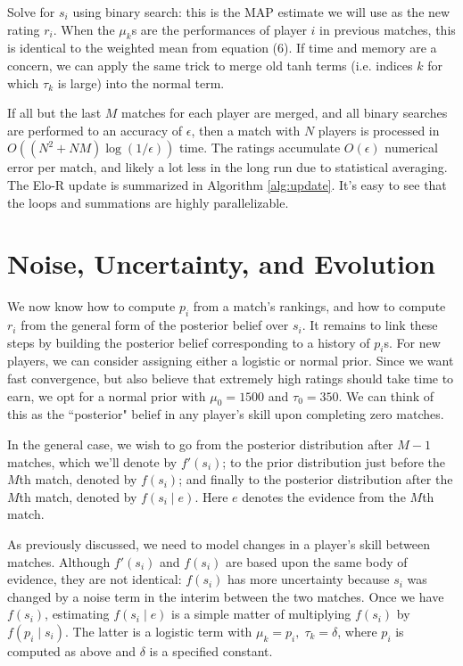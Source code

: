 \documentclass{article}
\begin{document}
Solve for $s_i$ using binary search: this is the MAP estimate we will use as the new rating $r_i$. When the $\mu_k$s are the performances of player $i$ in previous matches, this is identical to the weighted mean from equation (6). If time and memory are a concern, we can apply the same trick to merge old tanh terms (i.e. indices $k$ for which $\tau_k$ is large) into the normal term.

If all but the last $M$ matches for each player are merged, and all binary searches are performed to an accuracy of $\epsilon$, then a match with $N$ players is processed in $O((N^2+NM)\log(1/\epsilon))$ time. The ratings accumulate $O(\epsilon)$ numerical error per match, and likely a lot less in the long run due to statistical averaging. The Elo-R update is summarized in Algorithm \ref{alg:update}. It's easy to see that the loops and summations are highly parallelizable.

\section{Noise, Uncertainty, and Evolution}

We now know how to compute $p_i$ from a match's rankings, and how to compute $r_i$ from the general form of the posterior belief over $s_i$. It remains to link these steps by building the posterior belief corresponding to a history of $p_i$s. For new players, we can consider assigning either a logistic or normal prior. Since we want fast convergence, but also believe that extremely high ratings should take time to earn, we opt for a normal prior with $\mu_0 = 1500$ and $\tau_0 = 350$. We can think of this as the ``posterior" belief in any player's skill upon completing zero matches.

In the general case, we wish to go from the posterior distribution after $M-1$ matches, which we'll denote by $f'(s_i)$; to the prior distribution just before the $M$th match, denoted by $f(s_i)$; and finally to the posterior distribution after the $M$th match, denoted by $f(s_i \mid e)$. Here $e$ denotes the evidence from the $M$th match.

As previously discussed, we need to model changes in a player's skill between matches. Although $f'(s_i)$ and $f(s_i)$ are based upon the same body of evidence, they are not identical: $f(s_i)$ has more uncertainty because $s_i$ was changed by a noise term in the interim between the two matches. Once we have $f(s_i)$, estimating $f(s_i \mid e)$ is a simple matter of multiplying $f(s_i)$ by $f(p_i \mid s_i)$. The latter is a logistic term with $\mu_k = p_i,\;\tau_k=\delta$, where $p_i$ is computed as above and $\delta$ is a specified constant.
\end{document}
